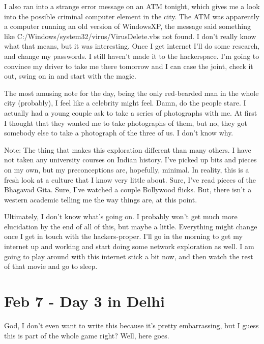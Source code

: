 \documentclass[11pt]{amsart}
\begin{document}
I also ran into a strange error message on an ATM tonight, which gives me a look into the possible criminal computer element in the city. The ATM was apparently a computer running an old version of WindowsXP, the message said something like C:/Windows/system32/virus/VirusDelete.vbs not found. I don't really know what that means, but it was interesting. Once I get internet I'll do some research, and change my passwords. I still haven't made it to the hackerspace. I'm going to convince my driver to take me there tomorrow and I can case the joint, check it out, swing on in and start with the magic. 

The most amusing note for the day, being the only red-bearded man in the whole city (probably), I feel like a celebrity might feel. Damn, do the people stare. I actually had a young couple ask to take a series of photographs with me. At first I thought that they wanted me to take photographs of them, but no, they got somebody else to take a photograph of the three of us. I don't know why.

Note: The thing that makes this exploration different than many others. I have not taken any university courses on Indian history.  I've picked up bits and pieces on my own, but my preconceptions are, hopefully, minimal. In reality, this is a fresh look at a culture that I know very little about. Sure, I've read pieces of the Bhagavad Gita.  Sure, I've watched a couple Bollywood flicks. But, there isn't a western academic telling me the way things are, at this point.

Ultimately, I don't know what's going on. I probably won't get much more elucidation by the end of all of this, but maybe a little. Everything might change once I get in touch with the hackers-proper. I'll go in the morning to get my internet up and working and start doing some network exploration as well. I am going to play around with this internet stick a bit now, and then watch the rest of that movie and go to sleep.

\section{Feb 7 - Day 3 in Delhi}

God, I don't even want to write this because it's pretty embarrassing, but I guess this is part of the whole game right? Well, here goes.
\end{document}

